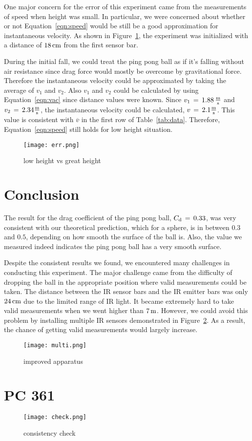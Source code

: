 \documentclass{article}
\begin{document}
\noindent One major concern for the error of this experiment came from the measurements of speed when height was small. In particular, we were concerned about whether or not Equation~\ref{eqn:speed} would be still be a good approximation for instantaneous velocity. As shown in Figure~\ref{fig:err}, the experiment was initialized with a distance of $18\,\textnormal{cm}$ from the first sensor bar. 

\noindent During the initial fall, we could treat the ping pong ball as if it's falling without air resistance since drag force would mostly be overcome by gravitational force. Therefore the instantaneous velocity could be approximated by taking the average of $v_{1}$ and $v_{2}$. Also $v_{1}$ and $v_{2}$ could be calculated by using Equation~\ref{eqn:vac} since distance values were known. Since $v_{1}\,=\,1.88\,\frac{\textnormal{m}}{\textnormal{s}}$ and $v_{2}\,=\,2.34\frac{\textnormal{m}}{\textnormal{s}}$, the instantaneous velocity could be calculated, $v\,=\,2.1\frac{\textnormal{m}}{\textnormal{s}}$. This value is consistent with $\overline{v}$ in the first row of Table~\ref{tab:data}. Therefore, Equation~\ref{eqn:speed} still holds for low height situation. 

\begin{figure}[H]
\centering
\texttt{[image: err.png]}
\caption{low height vs great height}
\label{fig:err}
\end{figure}

\section{Conclusion}
\noindent The result for the drag coefficient of the ping pong ball, $C_{\textnormal{d}}\,=\,0.33$, was very consistent with our theoretical prediction, which for a sphere, is in between $0.3$ and $0.5$, depending on how smooth the surface of the ball is. Also, the value we measured indeed indicates the ping pong ball has a very smooth surface. 

\noindent Despite the consistent results we found, we encountered many challenges in conducting this experiment. The major challenge came from the difficulty of dropping the ball in the appropriate position where valid measurements could be taken. The distance between the IR sensor bars and the IR emitter bars was only $24\,\textnormal{cm}$ due to the limited range of IR light. It became extremely hard to take valid measurements when we went higher than $7\,\textnormal{m}$. However, we could avoid this problem by installing multiple IR sensors demonstrated in Figure~\ref{fig:multi}. As a result, the chance of getting valid measurements would largely increase. 

\begin{figure}[H]
\centering
\texttt{[image: multi.png]}
\caption{improved apparatus}
\label{fig:multi}
\end{figure}


\section{PC 361}

\begin{figure}[H]
\centering
\texttt{[image: check.png]}
\caption{consistency check}
\label{fig:ch}
\end{figure}
\end{document}
